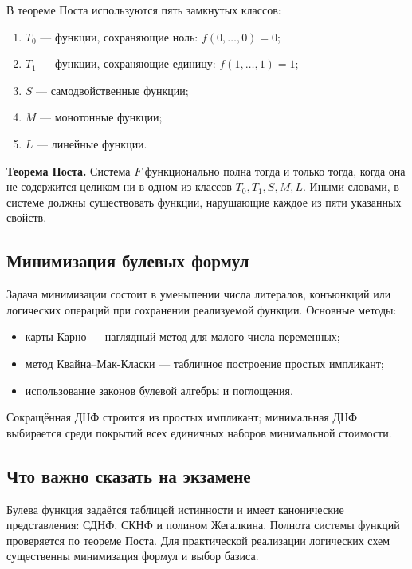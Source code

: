 В теореме Поста используются пять замкнутых классов:
\begin{enumerate}
    \item $T_0$ --- функции, сохраняющие ноль: $f(0,\ldots,0)=0$;
    \item $T_1$ --- функции, сохраняющие единицу: $f(1,\ldots,1)=1$;
    \item $S$ --- самодвойственные функции;
    \item $M$ --- монотонные функции;
    \item $L$ --- линейные функции.
\end{enumerate}

\textbf{Теорема Поста.}
Система $F$ функционально полна тогда и только тогда, когда она не содержится
целиком ни в одном из классов $T_0,T_1,S,M,L$. Иными словами, в системе должны
существовать функции, нарушающие каждое из пяти указанных свойств.

\subsection{Минимизация булевых формул}

Задача минимизации состоит в уменьшении числа литералов, конъюнкций или логических
операций при сохранении реализуемой функции. Основные методы:
\begin{itemize}
    \item карты Карно --- наглядный метод для малого числа переменных;
    \item метод Квайна--Мак-Класки --- табличное построение простых импликант;
    \item использование законов булевой алгебры и поглощения.
\end{itemize}

Сокращённая ДНФ строится из простых импликант; минимальная ДНФ выбирается среди
покрытий всех единичных наборов минимальной стоимости.

\subsection{Что важно сказать на экзамене}

Булева функция задаётся таблицей истинности и имеет канонические представления:
СДНФ, СКНФ и полином Жегалкина. Полнота системы функций проверяется по теореме
Поста. Для практической реализации логических схем существенны минимизация формул
и выбор базиса.

\newpage